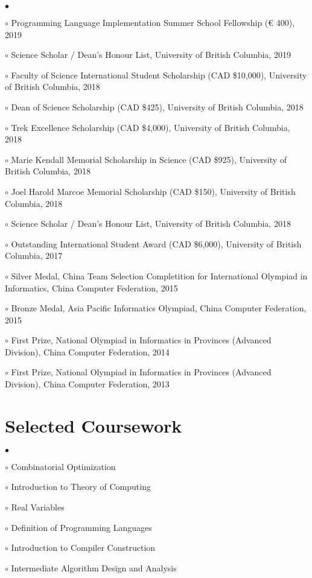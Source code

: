 \documentclass[margin,line]{res}
\newenvironment{list2}{
  \begin{list}{$\bullet$}{%
      \setlength{\itemsep}{0in}
      \setlength{\parsep}{0in} \setlength{\parskip}{0in}
      \setlength{\topsep}{0in} \setlength{\partopsep}{0in}
      \setlength{\leftmargin}{0.2in}}}{\end{list}}
\begin{document}
\begin{resume}
\begin{list2}
\item[$\circ$] Programming Language Implementation Summer School Fellowship (€ 400), 2019
\item[$\circ$] Science Scholar / Dean's Honour List, University of British Columbia, 2019
\item[$\circ$] Faculty of Science International Student Scholarship (CAD \$10,000), University of British Columbia, 2018
\item[$\circ$] Dean of Science Scholarship (CAD \$425), University of British Columbia, 2018
\item[$\circ$] Trek Excellence Scholarship (CAD \$4,000), University of British Columbia, 2018
\item[$\circ$] Marie Kendall Memorial Scholarship in Science (CAD \$925), University of British Columbia, 2018
\item[$\circ$] Joel Harold Marcoe Memorial Scholarship (CAD \$150), University of British Columbia, 2018
\item[$\circ$] Science Scholar / Dean's Honour List, University of British Columbia, 2018 
\item[$\circ$] Outstanding International Student Award (CAD \$6,000), University of British Columbia, 2017
\item[$\circ$] Silver Medal, China Team Selection Completition for International Olympiad in Informatics, China Computer Federation, 2015
\item[$\circ$] Bronze Medal, Asia Pacific Informatics Olympiad, China Computer Federation, 2015
\item[$\circ$] First Prize, National Olympiad in Informatics in Provinces (Advanced Division), China Computer Federation, 2014
\item[$\circ$] First Prize, National Olympiad in Informatics in Provinces (Advanced Division), China Computer Federation, 2013
\end{list2}


\section{\sc Selected Coursework}

\begin{list2}
\item[$\circ$] Combinatorial Optimization
\item[$\circ$] Introduction to Theory of Computing  
\item[$\circ$] Real Variables
\item[$\circ$] Definition of Programming Languages
\item[$\circ$] Introduction to Compiler Construction
\item[$\circ$] Intermediate Algorithm Design and Analysis 
\end{list2}



\end{resume}
\end{document}
